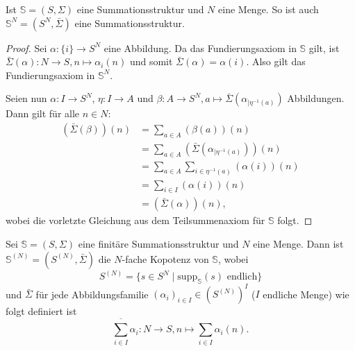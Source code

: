 \documentclass{article}
\begin{document}
\begin{theorem}\label{Theorem_OmegaPotenzSumStruktur}
  Ist $\mathbb{S} = (S, \Sigma)$ eine Summationsstruktur und $N$ eine Menge.
  So ist auch $\mathbb{S}^N = (S^N, \bar\Sigma)$ eine Summationsstruktur.
\end{theorem}
\begin{proof}
  Sei $\alpha \colon \{i\} \to S^N$ eine Abbildung.
  Da das Fundierungsaxiom in $\mathbb{S}$ gilt,
  ist $\bar\Sigma(\alpha) \colon N \to S, n \mapsto \alpha_i(n)$
  und somit $\bar\Sigma(\alpha) = \alpha(i)$.
  Also gilt das Fundierungsaxiom in $\mathbb{S}^N$.

  Seien nun $\alpha \colon I \to S^N$, 
  $\eta \colon I \to A$
   und $\beta \colon A \to S^N, a \mapsto \bar\Sigma(\alpha_{\mid \eta^{-1}(a)})$ Abbildungen.
  Dann gilt für alle $n \in N$:
  \begin{align*}
    (\bar\Sigma(\beta))(n) &= \sum_{a \in A}(\beta(a))(n) \\
    &= \sum_{a \in A}(\bar\Sigma(\alpha_{\mid \eta^{-1}(a)}))(n) \\
    &= \sum_{a \in A}\sum_{i \in \eta^{-1}(a)}(\alpha(i))(n) \\
    &= \sum_{i \in I}(\alpha(i))(n) \\
    &= (\bar\Sigma(\alpha))(n),
  \end{align*}
  wobei die vorletzte Gleichung aus dem Teilsummenaxiom für $\mathbb{S}$ folgt.
\end{proof}

\begin{definition}
  Sei $\mathbb{S} = (S, \Sigma)$ eine finitäre Summationsstruktur und $N$ eine Menge.
  Dann ist $\mathbb{S}^{(N)} = (S^{(N)}, \bar\Sigma)$ die $N$-fache Kopotenz von $\mathbb{S}$,
  wobei 
  \begin{equation*}
    S^{(N)} = \{s \in S^N \mid \text{supp}_\mathbb{S}(s) \text{ endlich}\}
  \end{equation*}
  und $\bar\Sigma$ für jede Abbildungsfamilie $(\alpha_i)_{i \in I} \in (S^{(N)})^I$
  ($I$ endliche Menge) wie folgt definiert ist
  \begin{equation*}
    \overline{\sum_{i \in I}} \alpha_i \colon N \to S, n \mapsto \sum_{i \in I}\alpha_i(n).
  \end{equation*}
\end{definition}
\end{document}
